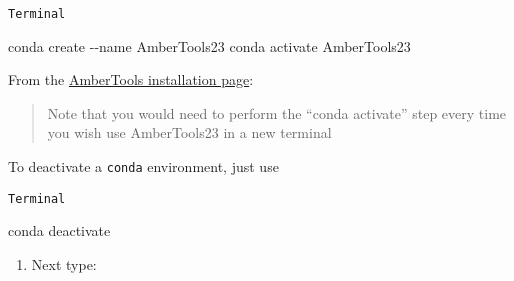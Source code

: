 \documentclass[
  letterpaper,
  DIV=11,
  numbers=noendperiod]{scrreprt}
\newenvironment{Shaded}{\begin{snugshade}}{\end{snugshade}}
\newcommand{\AttributeTok}[1]{\textcolor[rgb]{0.40,0.45,0.13}{#1}}
\newcommand{\ExtensionTok}[1]{\textcolor[rgb]{0.00,0.23,0.31}{#1}}
\newcommand{\NormalTok}[1]{\textcolor[rgb]{0.00,0.23,0.31}{#1}}
\providecommand{\tightlist}{%
  \setlength{\itemsep}{0pt}\setlength{\parskip}{0pt}}\usepackage{longtable,booktabs,array}
\begin{document}
\begin{codelisting}

\caption{\texttt{Terminal}}

\begin{Shaded}
\begin{Highlighting}[]
\ExtensionTok{conda}\NormalTok{ create }\AttributeTok{{-}{-}name}\NormalTok{ AmberTools23}
\ExtensionTok{conda}\NormalTok{ activate AmberTools23}
\end{Highlighting}
\end{Shaded}

\end{codelisting}

\begin{tcolorbox}[enhanced jigsaw, colback=white, breakable, titlerule=0mm, leftrule=.75mm, opacitybacktitle=0.6, bottomtitle=1mm, rightrule=.15mm, coltitle=black, arc=.35mm, bottomrule=.15mm, toprule=.15mm, title=\textcolor{quarto-callout-note-color}{\faInfo}\hspace{0.5em}{Note}, left=2mm, opacityback=0, colbacktitle=quarto-callout-note-color!10!white, colframe=quarto-callout-note-color-frame, toptitle=1mm]

From the \href{https://ambermd.org/GetAmber.php}{AmberTools installation
page}:

\begin{quote}
Note that you would need to perform the ``conda activate'' step every
time you wish use AmberTools23 in a new terminal
\end{quote}

To deactivate a \texttt{conda} environment, just use

\begin{codelisting}[H]

\caption{\texttt{Terminal}}

\begin{Shaded}
\begin{Highlighting}[]
\ExtensionTok{conda}\NormalTok{ deactivate}
\end{Highlighting}
\end{Shaded}

\end{codelisting}

\end{tcolorbox}

\begin{enumerate}
\def\labelenumi{\arabic{enumi}.}
\setcounter{enumi}{3}
\tightlist
\item
  Next type:
\end{enumerate}
\end{document}
